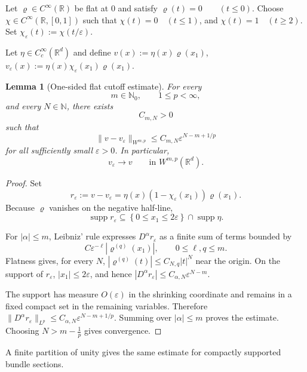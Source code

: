 \documentclass[11pt]{article}
\theoremstyle{plain}
\newtheorem{lemma}[theorem]{Lemma}
\theoremstyle{definition}
\begin{document}
Let \(\varrho\in C^\infty(\mathbb R)\) be flat at \(0\) and satisfy
\(\varrho(t)=0 \qquad (t\leq0)\).
Choose \(\chi\in C^\infty(\mathbb R,[0,1])\) such that
\(\chi(t)=0 \quad (t\leq1)\),
and
\(\chi(t)=1 \quad (t\geq2)\).
Set
\(\chi_\varepsilon(t) := \chi(t/\varepsilon)\).

Let \(\eta\in C_c^\infty(\mathbb R^d)\) and define
\(v(x) := \eta(x)\varrho(x_1)\),
\(v_\varepsilon(x) := \eta(x) \chi_\varepsilon(x_1) \varrho(x_1)\).

\begin{lemma}[One-sided flat cutoff estimate]
\label{lem:one-sided-flat-cutoff-estimate}
For every
\[
  m\in\mathbb N_0,
  \qquad
  1\leq p<\infty,
\]
and every \(N\in\mathbb N\), there exists
\[
  C_{m,N}>0
\]
such that
\[
  \boxed{
  \|v-v_\varepsilon\|_{W^{m,p}}
  \leq
  C_{m,N}
  \varepsilon^{N-m+1/p}
  }
\]
for all sufficiently small \(\varepsilon>0\). In particular,
\[
  v_\varepsilon
  \longrightarrow
  v
  \qquad
  \text{in }W^{m,p}(\mathbb R^d).
\]
\end{lemma}

\begin{proof}
Set
\[
  r_\varepsilon
  :=
  v-v_\varepsilon
  =
  \eta(x)
  \left(
    1-\chi_\varepsilon(x_1)
  \right)
  \varrho(x_1).
\]
Because \(\varrho\) vanishes on the negative half-line,
\[
  \operatorname{supp}r_\varepsilon
  \subseteq
  \left\{
    0\leq x_1\leq2\varepsilon
  \right\}
  \cap
  \operatorname{supp}\eta.
\]

For
\(|\alpha|\leq m\),
Leibniz' rule expresses \(D^\alpha r_\varepsilon\) as a finite sum of
terms bounded by
\[
  C
  \varepsilon^{-\ell}
  \left|
    \varrho^{(q)}(x_1)
  \right|,
  \qquad
  0\leq\ell,q\leq m.
\]
Flatness gives, for every \(N\), \(\left| \varrho^{(q)}(t) \right| \leq C_{N,q}|t|^N\) near the origin. On the support of \(r_\varepsilon\),
\(|x_1|\leq2\varepsilon\),
and hence
\(|D^\alpha r_\varepsilon| \leq C_{\alpha,N} \varepsilon^{N-m}\).

The support has measure \(O(\varepsilon)\) in the shrinking coordinate
and remains in a fixed compact set in the remaining variables.
Therefore
\(\|D^\alpha r_\varepsilon\|_{L^p} \leq C_{\alpha,N} \varepsilon^{N-m+1/p}\).
Summing over \(|\alpha|\leq m\) proves the estimate. Choosing \(N>m-\frac1p\) gives convergence.
\end{proof}

A finite partition of unity gives the same estimate for compactly supported bundle sections.

\end{document}
